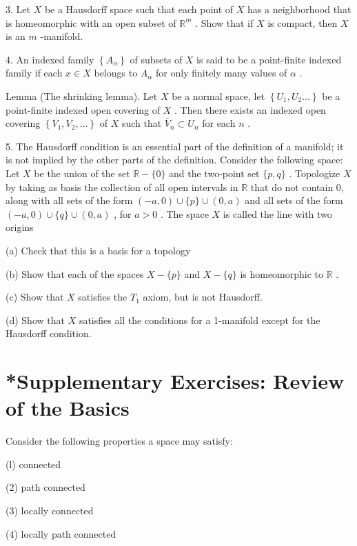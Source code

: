 3. Let \(X\) be a Hausdorff space such that each point of \(X\) has a neighborhood that is homeomorphic with an open subset of \({\mathbb{R}}^{m}\) . Show that if \(X\) is compact, then \(X\) is an \(m\) -manifold.

4. An indexed family \(\left\{  {A}_{\alpha }\right\}\) of subsets of \(X\) is said to be a point-finite indexed family if each \(x \in  X\) belongs to \({A}_{\alpha }\) for only finitely many values of \(\alpha\) .

Lemma (The shrinking lemma). Let \(X\) be a normal space, let \(\left\{  {{U}_{1},{U}_{2}\ldots }\right\}\) be a point-finite indexed open covering of \(X\) . Then there exists an indexed open covering \(\left\{  {{V}_{1},{V}_{2},\ldots }\right\}\) of \(X\) such that \({\bar{V}}_{n} \subset  {U}_{n}\) for each \(n\) .

5. The Hausdorff condition is an essential part of the definition of a manifold; it is not implied by the other parts of the definition. Consider the following space: Let \(X\) be the union of the set \(\mathbb{R} - \{ 0\}\) and the two-point set \(\{ p,q\}\) . Topologize \(X\) by taking as basis the collection of all open intervals in \(\mathbb{R}\) that do not contain 0, along with all sets of the form \(\left( {-a,0}\right)  \cup  \{ p\}  \cup  \left( {0,a}\right)\) and all sets of the form \(\left( {-a,0}\right)  \cup  \{ q\}  \cup  \left( {0,a}\right)\) , for \(a > 0\) . The space \(X\) is called the line with two origins

(a) Check that this is a basis for a topology

(b) Show that each of the spaces \(X - \{ p\}\) and \(X - \{ q\}\) is homeomorphic to \(\mathbb{R}\) .

(c) Show that \(X\) satisfies the \({T}_{1}\) axiom, but is not Hausdorff.

(d) Show that \(X\) satisfies all the conditions for a 1-manifold except for the Hausdorff condition.

\section*{*Supplementary Exercises: Review of the Basics}

Consider the following properties a space may satisfy:

(l) connected

(2) path connected

(3) locally connected

(4) locally path connected

